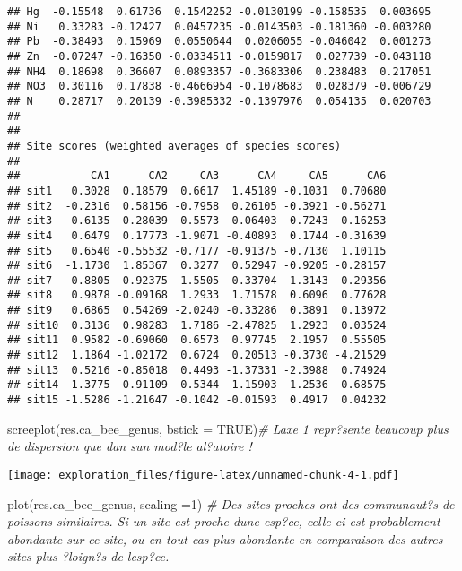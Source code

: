 \documentclass[
]{article}
\newenvironment{Shaded}{\begin{snugshade}}{\end{snugshade}}
\newcommand{\AttributeTok}[1]{\textcolor[rgb]{0.77,0.63,0.00}{#1}}
\newcommand{\CommentTok}[1]{\textcolor[rgb]{0.56,0.35,0.01}{\textit{#1}}}
\newcommand{\ConstantTok}[1]{\textcolor[rgb]{0.00,0.00,0.00}{#1}}
\newcommand{\DecValTok}[1]{\textcolor[rgb]{0.00,0.00,0.81}{#1}}
\newcommand{\FunctionTok}[1]{\textcolor[rgb]{0.00,0.00,0.00}{#1}}
\newcommand{\NormalTok}[1]{#1}
\begin{document}
\begin{verbatim}
## Hg  -0.15548  0.61736  0.1542252 -0.0130199 -0.158535  0.003695
## Ni   0.33283 -0.12427  0.0457235 -0.0143503 -0.181360 -0.003280
## Pb  -0.38493  0.15969  0.0550644  0.0206055 -0.046042  0.001273
## Zn  -0.07247 -0.16350 -0.0334511 -0.0159817  0.027739 -0.043118
## NH4  0.18698  0.36607  0.0893357 -0.3683306  0.238483  0.217051
## NO3  0.30116  0.17838 -0.4666954 -0.1078683  0.028379 -0.006729
## N    0.28717  0.20139 -0.3985332 -0.1397976  0.054135  0.020703
## 
## 
## Site scores (weighted averages of species scores)
## 
##           CA1      CA2     CA3      CA4     CA5      CA6
## sit1   0.3028  0.18579  0.6617  1.45189 -0.1031  0.70680
## sit2  -0.2316  0.58156 -0.7958  0.26105 -0.3921 -0.56271
## sit3   0.6135  0.28039  0.5573 -0.06403  0.7243  0.16253
## sit4   0.6479  0.17773 -1.9071 -0.40893  0.1744 -0.31639
## sit5   0.6540 -0.55532 -0.7177 -0.91375 -0.7130  1.10115
## sit6  -1.1730  1.85367  0.3277  0.52947 -0.9205 -0.28157
## sit7   0.8805  0.92375 -1.5505  0.33704  1.3143  0.29356
## sit8   0.9878 -0.09168  1.2933  1.71578  0.6096  0.77628
## sit9   0.6865  0.54269 -2.0240 -0.33286  0.3891  0.13972
## sit10  0.3136  0.98283  1.7186 -2.47825  1.2923  0.03524
## sit11  0.9582 -0.69060  0.6573  0.97745  2.1957  0.55505
## sit12  1.1864 -1.02172  0.6724  0.20513 -0.3730 -4.21529
## sit13  0.5216 -0.85018  0.4493 -1.37331 -2.3988  0.74924
## sit14  1.3775 -0.91109  0.5344  1.15903 -1.2536  0.68575
## sit15 -1.5286 -1.21647 -0.1042 -0.01593  0.4917  0.04232
\end{verbatim}

\begin{Shaded}
\begin{Highlighting}[]
\FunctionTok{screeplot}\NormalTok{(res.ca\_bee\_genus, }\AttributeTok{bstick =} \ConstantTok{TRUE}\NormalTok{)}\CommentTok{\# L\textquotesingle{}axe 1 repr?sente beaucoup plus de dispersion que dan sun mod?le al?atoire !}
\end{Highlighting}
\end{Shaded}

\texttt{[image: exploration\_files/figure-latex/unnamed-chunk-4-1.pdf]}

\begin{Shaded}
\begin{Highlighting}[]
\FunctionTok{plot}\NormalTok{(res.ca\_bee\_genus, }\AttributeTok{scaling =}\DecValTok{1}\NormalTok{) }\CommentTok{\# Des sites proches ont des communaut?s de poissons similaires. Si un site est proche d\textquotesingle{}une esp?ce, celle{-}ci est probablement abondante sur ce site, ou en tout cas plus abondante en comparaison des autres sites plus ?loign?s de l\textquotesingle{}esp?ce.}
\end{Highlighting}
\end{Shaded}
\end{document}
